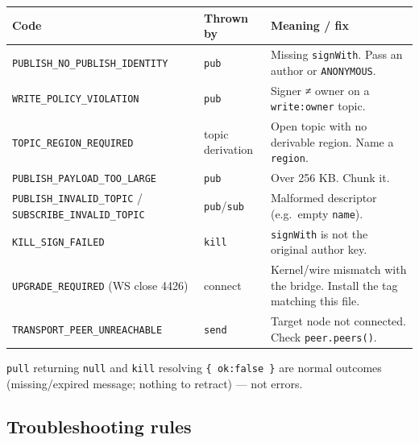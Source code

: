 \documentclass[
  nobib]{tufte-handout}
\newcounter{none} %
\begin{document}
{\def\LTcaptype{none} %
\begin{longtable}[]{@{}
  >{\raggedright\arraybackslash}p{}
  >{\raggedright\arraybackslash}p{}
  >{\raggedright\arraybackslash}p{}@{}}
\toprule\noalign{}
\begin{minipage}[b]{\linewidth}\raggedright
Code
\end{minipage} & \begin{minipage}[b]{\linewidth}\raggedright
Thrown by
\end{minipage} & \begin{minipage}[b]{\linewidth}\raggedright
Meaning / fix
\end{minipage} \\
\midrule\noalign{}
\endhead
\bottomrule\noalign{}
\endlastfoot
\texttt{PUBLISH\_NO\_PUBLISH\_IDENTITY} & \texttt{pub} & Missing
\texttt{signWith}. Pass an author or \texttt{ANONYMOUS}. \\
\texttt{WRITE\_POLICY\_VIOLATION} & \texttt{pub} & Signer ≠ owner on a
\texttt{write:\textquotesingle{}owner\textquotesingle{}} topic. \\
\texttt{TOPIC\_REGION\_REQUIRED} & topic derivation & Open topic with no
derivable region. Name a \texttt{region}. \\
\texttt{PUBLISH\_PAYLOAD\_TOO\_LARGE} & \texttt{pub} & Over 256 KB.
Chunk it. \\
\texttt{PUBLISH\_INVALID\_TOPIC} / \texttt{SUBSCRIBE\_INVALID\_TOPIC} &
\texttt{pub}/\texttt{sub} & Malformed descriptor (e.g.~empty
\texttt{name}). \\
\texttt{KILL\_SIGN\_FAILED} & \texttt{kill} & \texttt{signWith} is not
the original author key. \\
\texttt{UPGRADE\_REQUIRED} (WS close 4426) & connect & Kernel/wire
mismatch with the bridge. Install the tag matching this file. \\
\texttt{TRANSPORT\_PEER\_UNREACHABLE} & \texttt{send} & Target node not
connected. Check \texttt{peer.peers()}. \\
\end{longtable}
}

\texttt{pull} returning \texttt{null} and \texttt{kill} resolving
\texttt{\{\ ok:false\ \}} are normal outcomes (missing/expired message;
nothing to retract) --- not errors.

\subsection{Troubleshooting rules}\label{troubleshooting-rules}
\end{document}
